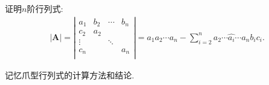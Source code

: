 \documentclass[../../main.tex]{subfiles}%
\begin{document}
\begin{proposition}\label{proposition:爪型行列式}
证明$n$阶行列式:
\begin{gather}
|\boldsymbol{A}|=\left| \begin{matrix}
a_1&		b_2&		\cdots&		b_n\\
c_2&		a_2&		&		\\
\vdots&		&		\ddots&		\\
c_n&		&		&		a_n\\
\end{matrix} \right|
=a_1a_2\cdots a_n-\sum_{i=2}^n{a_2}\cdots \widehat{a_i}\cdots a_nb_ic_i.
\nonumber
\end{gather}
\end{proposition}
\begin{note}
记忆爪型行列式的计算方法和结论.
\end{note}
\end{document}
